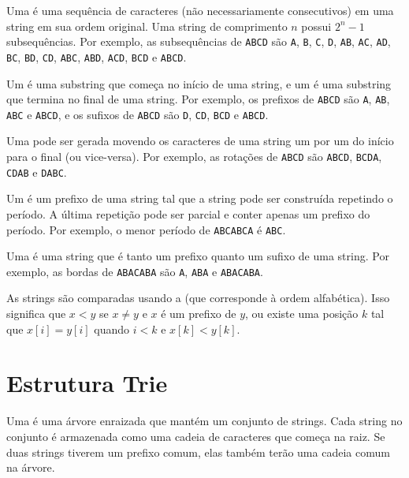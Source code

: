
Uma  é uma sequência de caracteres (não necessariamente consecutivos) em uma string em sua ordem original. Uma string de comprimento $n$ possui $2^n-1$ subsequências. Por exemplo, as subsequências de \texttt{ABCD} são \texttt{A}, \texttt{B}, \texttt{C}, \texttt{D}, \texttt{AB}, \texttt{AC}, \texttt{AD}, \texttt{BC}, \texttt{BD}, \texttt{CD}, \texttt{ABC}, \texttt{ABD}, \texttt{ACD}, \texttt{BCD} e \texttt{ABCD}.


Um  é uma substring que começa no início de uma string, e um  é uma substring que termina no final de uma string. Por exemplo, os prefixos de \texttt{ABCD} são \texttt{A}, \texttt{AB}, \texttt{ABC} e \texttt{ABCD}, e os sufixos de \texttt{ABCD} são \texttt{D}, \texttt{CD}, \texttt{BCD} e \texttt{ABCD}.


Uma  pode ser gerada movendo os caracteres de uma string um por um do início para o final (ou vice-versa). Por exemplo, as rotações de \texttt{ABCD} são \texttt{ABCD}, \texttt{BCDA}, \texttt{CDAB} e \texttt{DABC}.


Um  é um prefixo de uma string tal que a string pode ser construída repetindo o período. A última repetição pode ser parcial e conter apenas um prefixo do período. Por exemplo, o menor período de \texttt{ABCABCA} é \texttt{ABC}.


Uma  é uma string que é tanto um prefixo quanto um sufixo de uma string. Por exemplo, as bordas de \texttt{ABACABA} são \texttt{A}, \texttt{ABA} e \texttt{ABACABA}.


As strings são comparadas usando a  (que corresponde à ordem alfabética). Isso significa que $x<y$ se $x \neq y$ e $x$ é um prefixo de $y$, ou existe uma posição $k$ tal que $x[i]=y[i]$ quando $i<k$ e $x[k]<y[k]$.

\section{Estrutura Trie}


Uma  é uma árvore enraizada que mantém um conjunto de strings. Cada string no conjunto é armazenada como uma cadeia de caracteres que começa na raiz. Se duas strings tiverem um prefixo comum, elas também terão uma cadeia comum na árvore.

